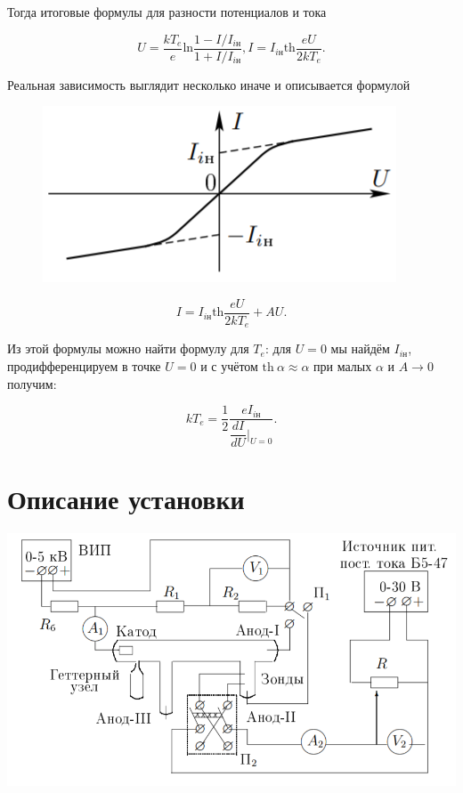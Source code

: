 \documentclass[a4paper, 12pt]{article}
\begin{document}
            Тогда итоговые формулы для разности потенциалов и тока

            \begin{equation}
                U = \dfrac{kT_e}{e}\text{ln}\dfrac{1 - I/I_{i\text{н}}}{1 + I/I_{i\text{н}}},
                I = I_{i\text{н}} \text{th}\dfrac{eU}{2kT_e}.
            \end{equation}

            Реальная зависимость выглядит несколько иначе и описывается формулой

            \begin{figure}
                \includegraphics[scale=0.8]{img/4.png}
                \vspace{+30pt}
            \end{figure}

            \begin{equation}
                I = I_{i\text{н}} \text{th}\dfrac{eU}{2kT_e} + AU.
            \end{equation}

            Из этой формулы можно найти формулу для $T_e$: для $U=0$ мы найдём $I_{i\text{н}}$, продифференцируем в точке $U=0$ и с учётом $\text{th}~\alpha \approx \alpha$ при малых $\alpha$ и $A\rightarrow 0$ получим:

            \begin{equation}
                kT_e = \dfrac{1}{2}\dfrac{eI_{i\text{н}}}{\dfrac{dI}{dU}|_{U=0}}.
            \end{equation}

    \section*{Описание установки}

        \begin{center}
            \includegraphics[scale=0.6]{img/1.png}
        \end{center}
\end{document}
